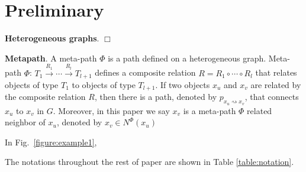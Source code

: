 \section{Preliminary}
\label{sec:pre}

\begin{definition}
\textbf{ Heterogeneous graphs}. 
\hfill$\Box$
\end{definition}

\begin{example}
\end{example}

\begin{definition}
\textbf{Metapath}\citep{SunHYYW11}. 
A meta-path $\Phi$ is a path defined on a heterogeneous graph. Meta-path $\Phi$: $T_1 \stackrel{R_1}{\longrightarrow} \cdots \stackrel{R_l}{\longrightarrow} T_{l+1}$ defines a composite relation $R = R_1 \circ \cdots \circ R_l$ that relates objects of type $T_1$ to objects of type $T_{l+1}$. If two objects $x_u$ and $x_v$ are related by the composite relation $R$, then there is a path, denoted by $p_{x_u \rightsquigarrow x_v}$, that connects $x_u$ to $x_v$ in $G$. Moreover, in this paper we say $x_v$ is a meta-path $\Phi$ related neighbor of $x_u$, denoted by $x_v \in N^\Phi(x_u)$

\end{definition}

\begin{example}
In Fig.~\ref{figure:example1},
\end{example}

The notations throughout the rest of paper are shown in Table \ref{table:notation}.


